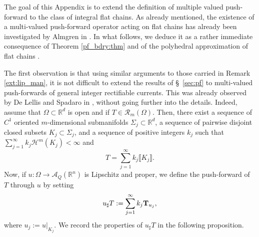 \documentclass[a4paper,11pt,reqno]{amsart}
\theoremstyle{definition}
\numberwithin{equation}{section}
\numberwithin{subsection}{section}
\newcommand{\R}{\mathbb{R}}
\newcommand{\A}{\mathcal{A}}
\newcommand{\Rc}{\mathscr{R}}
\newcommand{\Ha}{\mathcal{H}}
\begin{document}
The goal of this Appendix is to extend the definition of multiple valued push-forward to the class of integral flat chains. As already mentioned, the existence of a multi-valued push-forward operator acting on flat chains has already been investigated by Almgren in \cite[Section 1.6]{Almgren00}. In what follows, we deduce it as a rather immediate consequence of Theorem \ref{pf_bdry:thm} and of the polyhedral approximation of flat chains \cite[Theorem 4.2.22]{Federer69}.

The first observation is that using similar arguments to those carried in Remark \ref{ext:lip_man}, it is not difficult to extend the results of \S\, \ref{sec:pf} to multi-valued push-forwards of general integer rectifiable currents. This was already observed by De Lellis and Spadaro in \cite{DLS13a}, without going further into the details. Indeed, assume that $\Omega \subset \R^{d}$ is open and if $T \in \Rc_{m}(\Omega)$. Then, there exist a sequence of $C^{1}$ oriented $m$-dimensional submanifolds $\Sigma_{j} \subset \R^{d}$, a sequence of pairwise disjoint closed subsets $K_{j} \subset \Sigma_{j}$, and a sequence of positive integers $k_{j}$ such that $\sum_{j=1}^{\infty} k_{j} \Ha^{m}(K_{j}) < \infty$ and
\begin{equation} \label{ir_repr}
T = \sum_{j=1}^{\infty} k_{j} \llbracket K_{j} \rrbracket.
\end{equation}
Now, if $u \colon \Omega \to \A_{Q}(\R^{n})$ is Lipschitz and proper, we define the push-forward of $T$ through $u$ by setting 
\begin{equation} \label{Q_pf_ir:repr}
u_{\sharp} T := \sum_{j=1}^{\infty} k_{j} {\bf T}_{u_j},
\end{equation}
where $u_{j} := u|_{K_{j}}$. We record the properties of $u_{\sharp} T$ in the following proposition.
\end{document}

